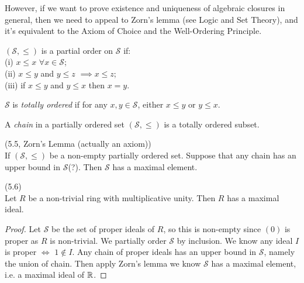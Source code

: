 \documentclass[a4paper]{article}
\begin{document}
However, if we want to prove existence and uniqueness of algebraic closures in general, then we need to appeal to Zorn's lemma (see Logic and Set Theory), and it's equivalent to the Axiom of Choice and the Well-Ordering Principle.

\begin{defi}
$(\mathcal{S},\leq)$ is a partial order on $\mathcal{S}$ if:\\
(i) $x \leq x$ $\forall x \in \mathcal{S}$;\\
(ii) $x \leq y$ and $y \leq z$ $\implies x \leq z$;\\
(iii) if $x \leq y$ and $y \leq x$ then $x = y$.
\end{defi}

$\mathcal{S}$ is \emph{totally ordered} if for any $x,y \in \mathcal{S}$, either $x \leq y$ or $y \leq x$.

A \emph{chain} in a partially ordered set $(\mathcal{S},\leq)$ is a totally ordered subset.

\begin{lemma} (5.5, Zorn's Lemma (actually an axiom))\\
If $(\mathcal{S},\leq)$ be a non-empty partially ordered set. Suppose that any chain has an upper bound in $\mathcal{S}$(?). Then $\mathcal{S}$ has a maximal element.
\end{lemma}

\begin{lemma} (5.6)\\
Let $R$ be a non-trivial ring with multiplicative unity. Then $R$ has a maximal ideal.
\begin{proof}
Let $\mathcal{S}$ be the set of proper ideals of $R$, so this is non-empty since $(0)$ is proper as $R$ is non-trivial. We partially order $\mathcal{S}$ by inclusion. We know any ideal $I$ is proper $\iff$ $1 \not\in I$. Any chain of proper ideals has an upper bound in $\mathcal{S}$, namely the union of chain. Then apply Zorn's lemma we know $\mathcal{S}$ has a maximal element, i.e. a maximal ideal of $\mathbb{R}$.
\end{proof}
\end{lemma}
\end{document}
